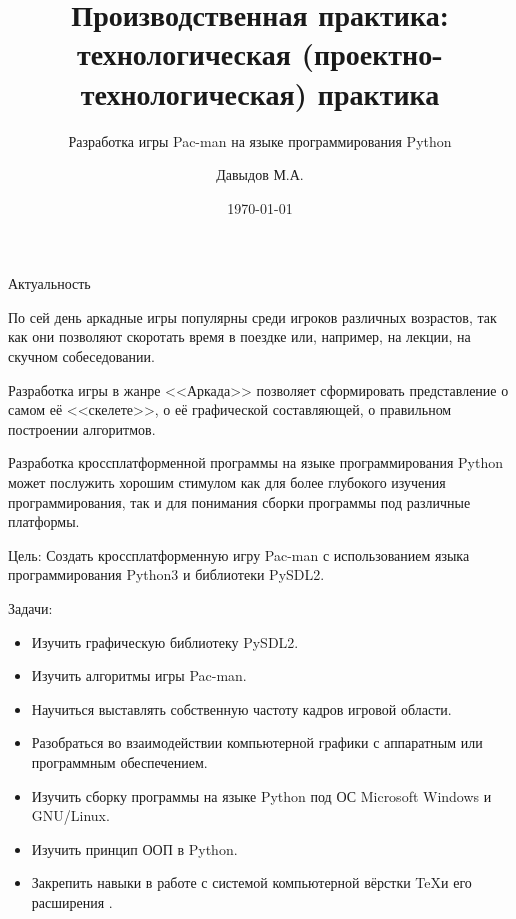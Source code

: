 \documentclass[10pt,a4paper,mathserif]{beamer}
\title{Производственная практика: технологическая (проектно-технологическая) практика}
\subtitle{Разработка игры Pac-man на языке программирования Python}
\author{Давыдов М.А.}
\institute{группа 5.205-1}
\date{\today}
\begin{document}
\begin{frame}
\maketitle
\end{frame}

\begin{frame}{Актуальность}
    \begin{block}{}
    По сей день аркадные игры популярны среди игроков различных возрастов, так как они позволяют скоротать время в поездке или, например, на лекции, на скучном собеседовании.
    \end{block}

    \begin{block}{}
    Разработка игры в жанре <<Аркада>> позволяет сформировать представление о самом её <<скелете>>, о её графической составляющей, о правильном построении алгоритмов.
    \end{block}

    \begin{block}{}
    Разработка кроссплатформенной программы на языке программирования Python может послужить хорошим стимулом как для более глубокого изучения программирования, так и для понимания сборки программы под различные платформы.
    \end{block}
\end{frame}

\begin{frame}{}
    \begin{block}{Цель:}
        \small{Создать кроссплатформенную игру Pac-man с использованием языка программирования Python3 и библиотеки PySDL2.}
    \end{block}

    \begin{block}{Задачи:}
        \begin{itemize}
            \item \small{Изучить графическую библиотеку PySDL2.}
            \item \small{Изучить алгоритмы игры Pac-man.}
            \item \small{Научиться выставлять собственную частоту кадров игровой области.}
        	\item \small{Разобраться во взаимодействии компьютерной графики с аппаратным или программным обеспечением.}
        	\item \small{Изучить сборку программы на языке Python под ОС Microsoft Windows и GNU/Linux.}
        	\item \small{Изучить принцип ООП в Python.}
        	\item \small{Закрепить навыки в работе с системой компьютерной вёрстки \TeX и его расширения \XeTeX.}
        \end{itemize}
    \end{block}

\end{frame}
\end{document}
